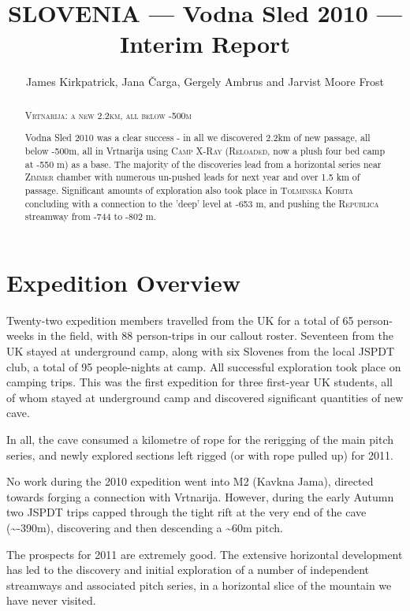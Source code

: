 \documentclass[english,a4]{article}
\begin{document}
\title{SLOVENIA --- Vodna Sled 2010 --- Interim Report}


\author{James Kirkpatrick, Jana \v{C}arga, Gergely Ambrus and Jarvist Moore
Frost}
\maketitle
\begin{abstract}
\textsc{Vrtnarija: a new 2.2km, all below -500m}

Vodna Sled 2010 was a clear success - in all we discovered 2.2km of
new passage, all below -500m, all in Vrtnarija using \textsc{Camp
X-Ray} (\textsc{Reloaded}, now a plush four bed camp at -550 m) as a base.
The majority of the discoveries lead from a horizontal series near
\textsc{Zimmer} chamber with numerous un-pushed leads for next year
and over 1.5 km of passage. Significant amounts of exploration also
took place in \textsc{Tolminska Korita} concluding with a connection
to the 'deep' level at -653 m, and pushing the \textsc{Republica}
streamway from -744 to -802 m.
\end{abstract}

\tableofcontents

\section{Expedition Overview}

Twenty-two expedition members travelled from the UK for a total of
65 person-weeks in the field, with 88 person-trips in our callout
roster. Seventeen from the UK stayed at underground camp, along with
six Slovenes from the local JSPDT club, a total of 95 people-nights
at camp. All successful exploration took place on camping trips. 
This was the first expedition for three
first-year UK students, all of whom stayed at underground camp and
discovered significant quantities of new cave.

In all, the cave consumed a kilometre of rope for the rerigging of
the main pitch series, and newly explored sections left rigged (or
with rope pulled up) for 2011.

No work during the 2010 expedition went into M2 (Kavkna Jama), directed
towards forging a connection with Vrtnarija. However, during the early
Autumn two JSPDT trips capped through the tight rift at the very end
of the cave (\textasciitilde{}-390m), discovering and then descending
a \textasciitilde{}60m pitch.

The prospects for 2011 are extremely good. The extensive horizontal
development has led to the discovery and initial exploration of a
number of independent streamways and associated pitch series, in a
horizontal slice of the mountain we have never visited.
\end{document}
